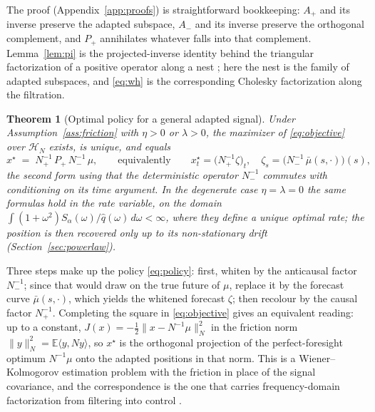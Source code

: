 \documentclass[11pt]{article}
\newcommand{\E}{\mathbb{E}}
\theoremstyle{plain}
\newtheorem{theorem}{Theorem}
\theoremstyle{definition}
\theoremstyle{remark}
\begin{document}
The proof (Appendix~\ref{app:proofs}) is straightforward bookkeeping: $A_+$ and its inverse preserve the adapted subspace, $A_-$ and its inverse preserve the orthogonal complement, and $P_+$ annihilates whatever falls into that complement. Lemma~\ref{lem:pi} is the projected-inverse identity behind the triangular factorization of a positive operator along a nest \citep{GohbergKrein1970,Arveson1975}; here the nest is the family of adapted subspaces, and \eqref{eq:wh} is the corresponding Cholesky factorization along the filtration.

\begin{theorem}[Optimal policy for a general adapted signal]\label{thm:general}
Under Assumption~\ref{ass:friction} with $\eta>0$ or $\lambda>0$, the maximizer of \eqref{eq:objective} over $\mathcal H_N$ exists, is unique, and equals
\begin{equation}\label{eq:policy}
x^\star \;=\; N_+^{-1}\,P_+\,N_-^{-1}\,\mu ,
\qquad\text{equivalently}\qquad
x^\star_t = \bigl(N_+^{-1}\zeta\bigr)_t, \quad
\zeta_s = \bigl(N_-^{-1}\,\bar\mu(s,\cdot)\bigr)(s),
\end{equation}
the second form using that the deterministic operator $N_-^{-1}$ commutes with conditioning on its time argument. In the degenerate case $\eta=\lambda=0$ the same formulas hold in the rate variable, on the domain $\int(1+\omega^2)S_\alpha(\omega)/\hat q(\omega)\,d\omega<\infty$, where they define a unique optimal rate; the position is then recovered only up to its non-stationary drift (Section~\ref{sec:powerlaw}).
\end{theorem}

Three steps make up the policy \eqref{eq:policy}: first, whiten by the anticausal factor $N_-^{-1}$; since that would draw on the true future of $\mu$, replace it by the forecast curve $\bar\mu(s,\cdot)$, which yields the whitened forecast $\zeta$; then recolour by the causal factor $N_+^{-1}$. Completing the square in \eqref{eq:objective} gives an equivalent reading: up to a constant, $J(x)=-\tfrac12\|x-N^{-1}\mu\|_N^2$ in the friction norm $\|y\|_N^2=\E\langle y,Ny\rangle$, so $x^\star$ is the orthogonal projection of the perfect-foresight optimum $N^{-1}\mu$ onto the adapted positions in that norm. This is a Wiener--Kolmogorov estimation problem with the friction in place of the signal covariance, and the correspondence is the one that carries frequency-domain factorization from filtering into control \citep{Wiener1949,Whittle1963,Whiteman1985}.
\end{document}
